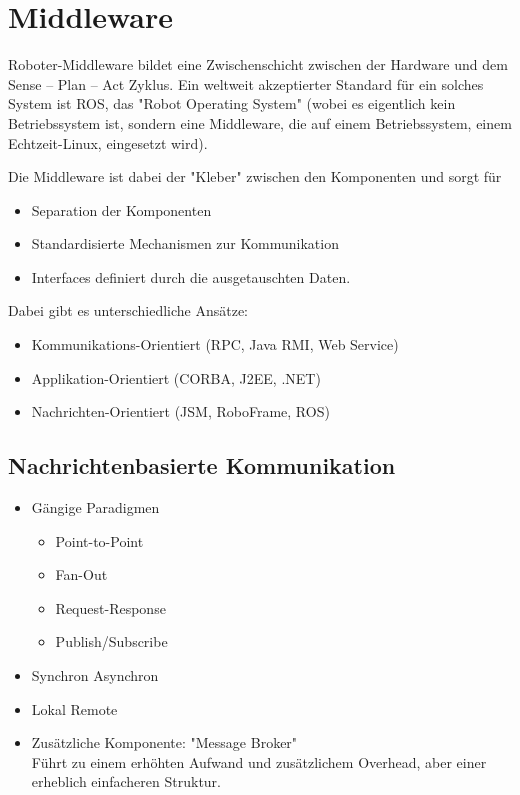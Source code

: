 	\section{Middleware}
		Roboter-Middleware bildet eine Zwischenschicht zwischen der Hardware und dem Sense -- Plan -- Act Zyklus. Ein weltweit akzeptierter Standard für ein solches System ist ROS, das "Robot Operating System" (wobei es eigentlich kein Betriebssystem ist, sondern eine Middleware, die auf einem Betriebssystem, \zB einem Echtzeit-Linux, eingesetzt wird).

		Die Middleware ist dabei der "Kleber" zwischen den Komponenten und sorgt für
		\begin{itemize}
			\item Separation der Komponenten
			\item Standardisierte Mechanismen zur Kommunikation
			\item Interfaces definiert durch die ausgetauschten Daten.
		\end{itemize}
		Dabei gibt es unterschiedliche Ansätze:
		\begin{itemize}
			\item Kommunikations-Orientiert (RPC, Java RMI, Web Service)
			\item Applikation-Orientiert (CORBA, J2EE, .NET)
			\item Nachrichten-Orientiert (JSM, RoboFrame, ROS)
		\end{itemize}

		\subsection{Nachrichtenbasierte Kommunikation}
			\begin{itemize}
				\item Gängige Paradigmen
					\begin{itemize}
						\item Point-to-Point
						\item Fan-Out
						\item Request-Response
						\item Publish/Subscribe
					\end{itemize}
				\item Synchron \vs Asynchron
				\item Lokal \vs Remote
				\item Zusätzliche Komponente: "Message Broker" \\ Führt zu einem erhöhten Aufwand und zusätzlichem Overhead, aber einer erheblich einfacheren Struktur.
			\end{itemize}

